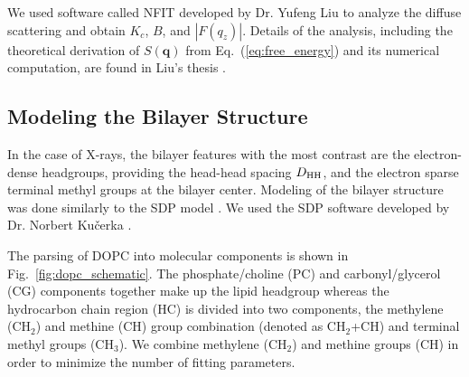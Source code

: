 We used software called NFIT developed by Dr. Yufeng Liu
\cite{Lyatskaya01,Liu04,Liu03} to analyze the diffuse scattering and
obtain $K_c$, $B$, and $|F(q_z)|$. 
Details of the analysis, including the theoretical derivation of
$S(\mathbf{q})$ from Eq.~(\ref{eq:free_energy}) and its
numerical computation, are found in Liu's thesis 
\cite{Liu03}. 

\subsection{Modeling the Bilayer Structure}\label{sec:SDP_method}
In the case of X-rays, the bilayer features with the most contrast are the 
electron-dense headgroups, providing the head-head spacing $D_\textrm{HH}$,
and the electron sparse terminal methyl groups at the bilayer center.
Modeling of the bilayer structure was done similarly to the SDP model \cite{Kucerka08}.
We used the SDP software developed by Dr. Norbert Ku\v{c}erka \cite{Kucerka08}. 

The parsing of DOPC into molecular components is shown in
Fig.~\ref{fig:dopc_schematic}. The phosphate/choline (PC) and 
carbonyl/glycerol (CG) components together make up the lipid headgroup
whereas the hydrocarbon chain region (HC)
is divided into two components, the methylene (CH$_2$) and methine (CH) group
combination (denoted as CH$_2$+CH) and terminal methyl groups (CH$_3$). 
We combine methylene (CH$_2$) and methine groups (CH) in order to 
minimize the number of fitting parameters.

